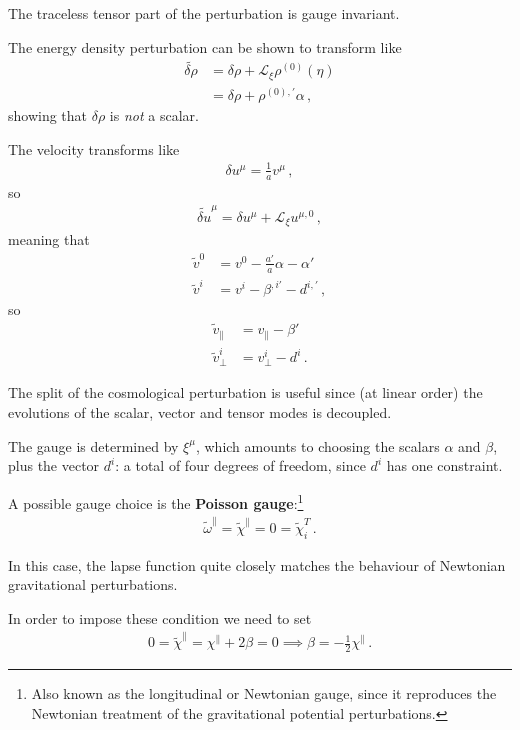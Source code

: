 \documentclass[main.tex]{subfiles}
\begin{document}
The traceless tensor part of the perturbation is gauge invariant. 

The energy density perturbation can be shown to transform like 
%
\begin{align}
\widetilde{\delta \rho } &= \delta \rho + \mathscr{L}_\xi \rho^{(0)} (\eta ) \\ 
&= \delta \rho + \rho^{(0), \prime} \alpha 
\,,
\end{align}
%
showing that \(\delta \rho \) is \emph{not} a scalar.
 
The velocity transforms like 
%
\begin{align}
\delta u^{\mu } = \frac{1}{a} v^{\mu } 
\,,
\end{align}
%
so 
%
\begin{align}
\widetilde{\delta u}^{\mu } = \delta u^{\mu } + \mathscr{L}_\xi u^{\mu , 0}
\,,
\end{align}
%
meaning that 
%
\begin{align}
\widetilde{v}^{0} &= v^{0} - \frac{a'}{a} \alpha - \alpha '  \\
\widetilde{v}^{i} &= v^{i} - \beta^{, i\prime} - d^{i, \prime}
\,,
\end{align}
%
so 
%
\begin{align}
\widetilde{v}_\parallel &= v_\parallel - \beta '  \\
\widetilde{v}^{i}_{\perp} &= v^{i}_\perp - d^i
\,.
\end{align}

The split of the cosmological perturbation is useful since (at linear order) the evolutions of the scalar, vector and tensor modes is decoupled.

The gauge is determined by \(\xi^{\mu }\), which amounts to choosing the scalars \(\alpha \) and \(\beta \), plus the vector \(d^{i} \): a total of four degrees of freedom, since \(d^{i} \) has one constraint. 

A possible gauge choice is the \textbf{Poisson gauge}:\footnote{Also known as the longitudinal or Newtonian gauge, since it reproduces the Newtonian treatment of the gravitational potential perturbations.}
%
\begin{align}
\widetilde{\omega}^{\parallel} = \widetilde{\chi}^{\parallel} = 0 = \widetilde{\chi}^{T}_i 
\,.
\end{align}

In this case, the lapse function quite closely matches the behaviour of Newtonian gravitational perturbations. 

In order to impose these condition we need to set
%
\begin{align}
0 = \widetilde{\chi}^{\parallel} = \chi^{\parallel} + 2 \beta = 0 \implies \beta = - \frac{1}{2} \chi^{\parallel}
\,.
\end{align}
%
\end{document}
